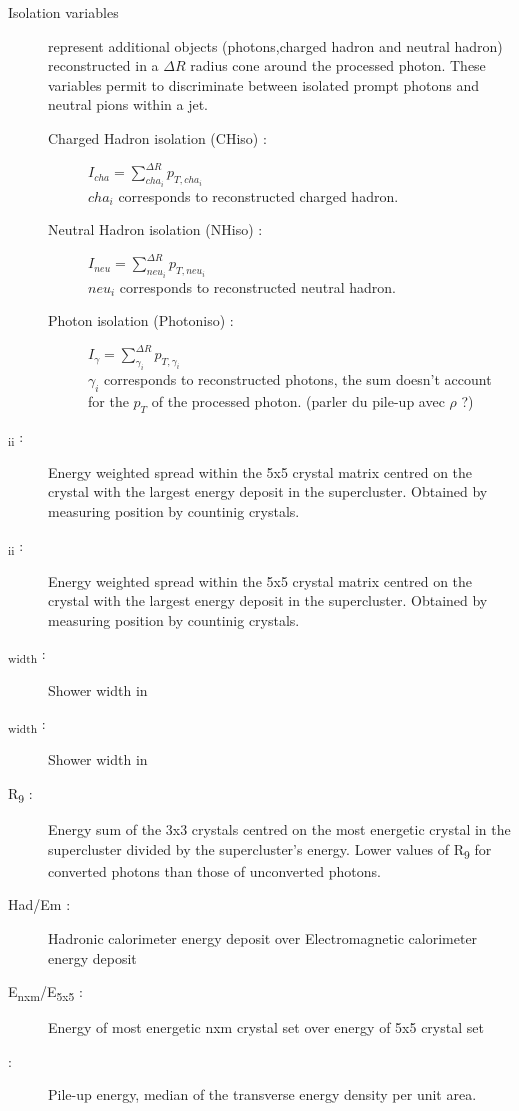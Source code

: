 \begin{description}
    \item [Isolation variables] represent additional objects (photons,charged hadron and neutral hadron) reconstructed
    in a $\Delta R$ radius cone around the processed photon. These variables permit to discriminate between isolated
    prompt photons and neutral pions within a jet.
    \begin{description}
	    \item [Charged Hadron isolation (CHiso) : ] $I_{cha} = \sum_{cha_i}^{\Delta R}{p_{T,cha_i}}$ \\
            $cha_i$ corresponds to reconstructed charged hadron.
	    \item [Neutral Hadron isolation (NHiso) : ] $I_{neu} = \sum_{neu_i}^{\Delta R}{p_{T,neu_i}}$ \\
            $neu_i$ corresponds to reconstructed neutral hadron.
        \item [Photon isolation (Photoniso) : ] $I_\gamma = \sum_{\gamma_i}^{\Delta R}{p_{T,\gamma_i}}$ \\
            $\gamma_i$ corresponds to reconstructed photons, the sum doesn't account for the $p_T$ of the processed
            photon. (parler du pile-up avec $\rho$ ?)
    \end{description}
    \item [\textsigma\textsubscript{i\texteta i\texteta} :] Energy weighted spread within the 5x5 crystal matrix centred on the crystal with the largest energy deposit in the supercluster. Obtained by measuring position by countinig crystals.
	\item [\textsigma\textsubscript{i\texteta i\textphi} :] Energy weighted spread within the 5x5 crystal matrix centred on the crystal with the largest energy deposit in the supercluster. Obtained by measuring position by countinig crystals.
    \item [\texteta\textsubscript{width} \: \textgamma :] Shower width in \texteta
    \item [\textphi\textsubscript{width} \: \textgamma :] Shower width in \textphi
	\item [R\textsubscript{9} \: \textgamma :] Energy sum of the 3x3 crystals centred on the most energetic crystal in
    the supercluster divided by the supercluster's energy. Lower values of R\textsubscript{9} for converted photons than those of unconverted photons.
	\item [Had/Em :] Hadronic calorimeter energy deposit over Electromagnetic calorimeter energy deposit
    \item [E\textsubscript{nxm}/E\textsubscript{5x5} :] Energy of most energetic nxm crystal set over energy of 5x5 crystal set
    \item [\textrho :] Pile-up energy, median of the transverse energy density per unit area.
\end{description}

